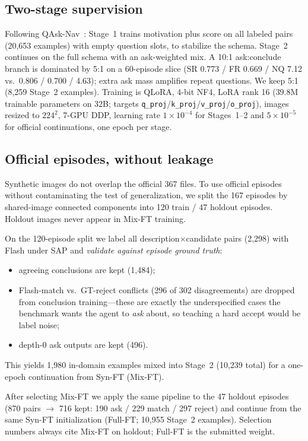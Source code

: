\documentclass[10pt,a4paper]{article}
\begin{document}
\subsection{Two-stage supervision}
Following QAsk-Nav~\cite{zorzi2026coinqa}: Stage~1 trains motivation
plus score on all labeled pairs (20{,}653 examples) with empty
question slots, to stabilize the schema. Stage~2 continues on the
full schema with an ask-weighted mix. A 10:1 ask:conclude branch is
dominated by 5:1 on a 60-episode slice (SR 0.773 / FR 0.669 / NQ 7.12
vs.\ 0.806 / 0.700 / 4.63); extra ask mass amplifies repeat questions.
We keep 5:1 (8{,}259 Stage~2 examples). Training is QLoRA, 4-bit NF4,
LoRA rank 16 ($39.8$M trainable parameters on 32B; targets
\texttt{q\_proj}/\texttt{k\_proj}/\texttt{v\_proj}/\texttt{o\_proj}), images
resized to $224^2$, 7-GPU DDP, learning rate $1\times 10^{-4}$ for
Stages~1--2 and $5\times 10^{-5}$ for official continuations, one epoch
per stage.

\subsection{Official episodes, without leakage}
Synthetic images do not overlap the official 367 files. To use official
episodes without contaminating the test of generalization, we split the
167 episodes by shared-image connected components into 120 train / 47
holdout episodes. Holdout images never appear in Mix-FT training.

On the 120-episode split we label all description$\times$candidate
pairs (2{,}298) with Flash under SAP and \emph{validate against episode
ground truth}:
\begin{itemize}
\item agreeing conclusions are kept (1{,}484);
\item Flash-match vs.\ GT-reject conflicts (296 of 302 disagreements)
are dropped from conclusion training---these are exactly the
underspecified cases the benchmark wants the agent to \emph{ask}
about, so teaching a hard accept would be label noise;
\item depth-0 ask outputs are kept (496).
\end{itemize}
This yields 1{,}980 in-domain examples mixed into Stage~2 (10{,}239
total) for a one-epoch continuation from Syn-FT (Mix-FT).

After selecting Mix-FT we apply the same pipeline to the 47 holdout
episodes (870 pairs $\rightarrow$ 716 kept: 190 ask / 229 match / 297
reject) and continue from the same Syn-FT initialization (Full-FT;
10{,}955 Stage~2 examples). Selection numbers always cite Mix-FT on
holdout; Full-FT is the submitted weight.
\end{document}
